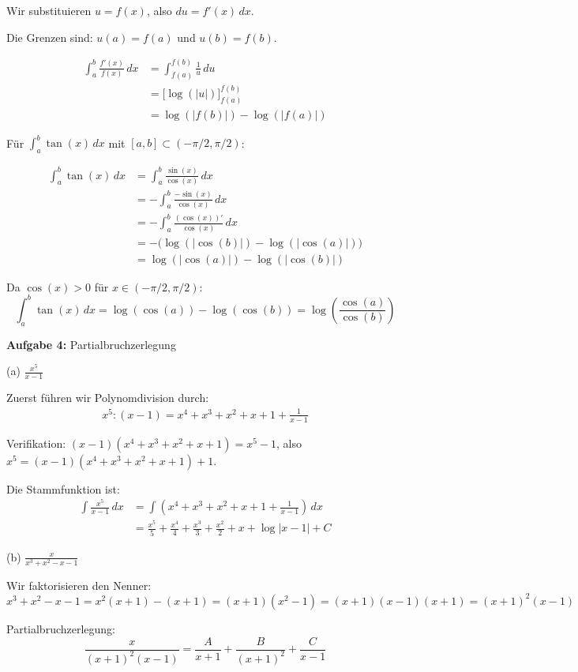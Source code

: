 \documentclass{article}
\begin{document}
Wir substituieren $u = f(x)$, also $du = f'(x)\,dx$.

Die Grenzen sind: $u(a) = f(a)$ und $u(b) = f(b)$.

\begin{align}
\int_a^b \frac{f'(x)}{f(x)}\,dx &= \int_{f(a)}^{f(b)} \frac{1}{u}\,du \\
&= \Big[\log(|u|)\Big]_{f(a)}^{f(b)} \\
&= \log(|f(b)|) - \log(|f(a)|)
\end{align}

Für $\int_a^b \tan(x)\,dx$ mit $[a,b] \subset (-\pi/2, \pi/2)$:

\begin{align}
\int_a^b \tan(x)\,dx &= \int_a^b \frac{\sin(x)}{\cos(x)}\,dx \\
&= -\int_a^b \frac{-\sin(x)}{\cos(x)}\,dx \\
&= -\int_a^b \frac{(\cos(x))'}{\cos(x)}\,dx \\
&= -\Big(\log(|\cos(b)|) - \log(|\cos(a)|)\Big) \\
&= \log(|\cos(a)|) - \log(|\cos(b)|)
\end{align}

Da $\cos(x) > 0$ für $x \in (-\pi/2, \pi/2)$:
$$\int_a^b \tan(x)\,dx = \log(\cos(a)) - \log(\cos(b)) = \log\left(\frac{\cos(a)}{\cos(b)}\right)$$

\textbf{Aufgabe 4:} Partialbruchzerlegung

(a) $\frac{x^5}{x-1}$

Zuerst führen wir Polynomdivision durch:
\begin{align}
x^5 : (x-1) = x^4 + x^3 + x^2 + x + 1 + \frac{1}{x-1}
\end{align}

Verifikation: $(x-1)(x^4 + x^3 + x^2 + x + 1) = x^5 - 1$, also $x^5 = (x-1)(x^4 + x^3 + x^2 + x + 1) + 1$.

Die Stammfunktion ist:
\begin{align}
\int \frac{x^5}{x-1}\,dx &= \int \left(x^4 + x^3 + x^2 + x + 1 + \frac{1}{x-1}\right)\,dx \\
&= \frac{x^5}{5} + \frac{x^4}{4} + \frac{x^3}{3} + \frac{x^2}{2} + x + \log|x-1| + C
\end{align}

(b) $\frac{x}{x^3+x^2-x-1}$

Wir faktorisieren den Nenner:
$x^3 + x^2 - x - 1 = x^2(x+1) - (x+1) = (x+1)(x^2-1) = (x+1)(x-1)(x+1) = (x+1)^2(x-1)$

Partialbruchzerlegung:
$$\frac{x}{(x+1)^2(x-1)} = \frac{A}{x+1} + \frac{B}{(x+1)^2} + \frac{C}{x-1}$$
\end{document}
